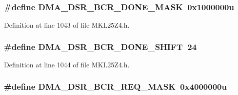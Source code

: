 \subsubsection[{\texorpdfstring{D\+M\+A\+\_\+\+D\+S\+R\+\_\+\+B\+C\+R\+\_\+\+D\+O\+N\+E\+\_\+\+M\+A\+SK}{DMA_DSR_BCR_DONE_MASK}}]{\setlength{\rightskip}{0pt plus 5cm}\#define D\+M\+A\+\_\+\+D\+S\+R\+\_\+\+B\+C\+R\+\_\+\+D\+O\+N\+E\+\_\+\+M\+A\+SK~0x1000000u}\hypertarget{group___d_m_a___register___masks_gaaa733d9c65fb074a9e836b8abaa8173f}{}\label{group___d_m_a___register___masks_gaaa733d9c65fb074a9e836b8abaa8173f}


Definition at line 1043 of file M\+K\+L25\+Z4.\+h.

\subsubsection[{\texorpdfstring{D\+M\+A\+\_\+\+D\+S\+R\+\_\+\+B\+C\+R\+\_\+\+D\+O\+N\+E\+\_\+\+S\+H\+I\+FT}{DMA_DSR_BCR_DONE_SHIFT}}]{\setlength{\rightskip}{0pt plus 5cm}\#define D\+M\+A\+\_\+\+D\+S\+R\+\_\+\+B\+C\+R\+\_\+\+D\+O\+N\+E\+\_\+\+S\+H\+I\+FT~24}\hypertarget{group___d_m_a___register___masks_gaa9063734a56a62385b42210acedc3144}{}\label{group___d_m_a___register___masks_gaa9063734a56a62385b42210acedc3144}


Definition at line 1044 of file M\+K\+L25\+Z4.\+h.

\subsubsection[{\texorpdfstring{D\+M\+A\+\_\+\+D\+S\+R\+\_\+\+B\+C\+R\+\_\+\+R\+E\+Q\+\_\+\+M\+A\+SK}{DMA_DSR_BCR_REQ_MASK}}]{\setlength{\rightskip}{0pt plus 5cm}\#define D\+M\+A\+\_\+\+D\+S\+R\+\_\+\+B\+C\+R\+\_\+\+R\+E\+Q\+\_\+\+M\+A\+SK~0x4000000u}\hypertarget{group___d_m_a___register___masks_ga24c6d2ae6aa7b472b69e357ef0729902}{}\label{group___d_m_a___register___masks_ga24c6d2ae6aa7b472b69e357ef0729902}



